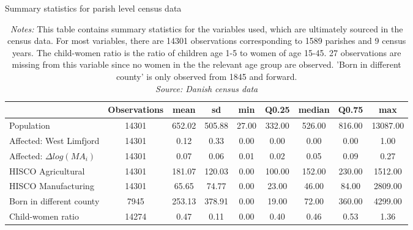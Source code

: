 \documentclass[11pt]{article}
\begin{document}
\begin{table}
\centering
\caption{Summary statistics for parish level census data}
\label{tab:desc_pop} 
\footnotesize
\begin{tabular}{lcccccccc}
\toprule
  & Observations & mean & sd & min & Q0.25 & median & Q0.75 & max\\
\midrule
Population & 14301 & 652.02 & 505.88 & 27.00 & 332.00 & 526.00 & 816.00 & 13087.00\\
Affected: West Limfjord & 14301 & 0.12 & 0.33 & 0.00 & 0.00 & 0.00 & 0.00 & 1.00\\
Affected: $\Delta log(MA_i)$ & 14301 & 0.07 & 0.06 & 0.01 & 0.02 & 0.05 & 0.09 & 0.27\\
HISCO Agricultural & 14301 & 181.07 & 120.03 & 0.00 & 100.00 & 152.00 & 230.00 & 1512.00\\
HISCO Manufacturing & 14301 & 65.65 & 74.77 & 0.00 & 23.00 & 46.00 & 84.00 & 2809.00\\
Born in different county & 7945 & 253.13 & 378.91 & 0.00 & 19.00 & 72.00 & 360.00 & 4299.00\\
Child-women ratio & 14274 & 0.47 & 0.11 & 0.00 & 0.40 & 0.46 & 0.53 & 1.36\\
\bottomrule
\end{tabular}
\parbox{0.9\textwidth}{
\caption*{\footnotesize \textit{Notes:} This table contains summary statistics for the variables used, which are ultimately sourced in the census data. For most variables, there are 14301 observations corresponding to 1589 parishes and 9 census years. The child-women ratio is the ratio of children age 1-5 to women of age 15-45. 27 observations are missing from this variable since no women in the the relevant age group are observed. 'Born in different county' is only observed from 1845 and forward. \\ \textit{Source: Danish census data}}
}
\end{table}
\end{document}
